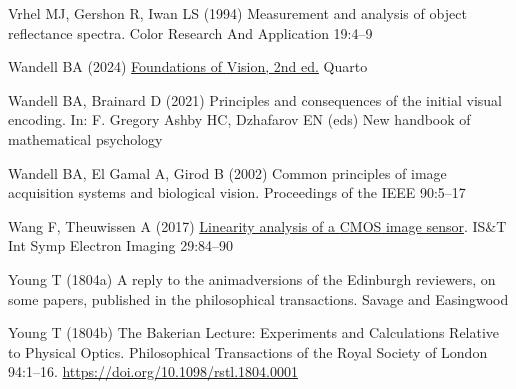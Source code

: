 \documentclass[
  letterpaper,
]{book}
\newlength{\cslhangindent}
\newenvironment{CSLReferences}[2] %
 {\begin{list}{}{%
  \setlength{\itemindent}{0pt}
  \setlength{\leftmargin}{0pt}
  \setlength{\parsep}{0pt}
  \ifodd #1
   \setlength{\leftmargin}{\cslhangindent}
   \setlength{\itemindent}{-1\cslhangindent}
  \fi
  \setlength{\itemsep}{#2\baselineskip}}}
 {\end{list}}
\begin{document}
\begin{CSLReferences}{1}{1}
Vrhel MJ, Gershon R, Iwan LS (1994) Measurement and analysis of object
reflectance spectra. Color Research And Application 19:4--9

Wandell BA (2024) \href{https://github.io.fov2024}{Foundations of
{Vision}, 2nd ed.} Quarto

Wandell BA, Brainard D (2021) Principles and consequences of the initial
visual encoding. In: F. Gregory Ashby HC, Dzhafarov EN (eds) New
handbook of mathematical psychology

Wandell BA, El Gamal A, Girod B (2002) Common principles of image
acquisition systems and biological vision. Proceedings of the IEEE
90:5--17

Wang F, Theuwissen A (2017)
\href{http://dx.doi.org/10.2352/issn.2470-1173.2017.11.imse-191}{Linearity
analysis of a {CMOS} image sensor}. IS\&T Int Symp Electron Imaging
29:84--90

Young T (1804a) A reply to the animadversions of the {Edinburgh}
reviewers, on some papers, published in the philosophical transactions.
{Savage and Easingwood}

Young T (1804b) {The Bakerian Lecture: Experiments and Calculations
Relative to Physical Optics}. Philosophical Transactions of the Royal
Society of London 94:1--16. \url{https://doi.org/10.1098/rstl.1804.0001}

\end{CSLReferences}


\backmatter
\end{document}
